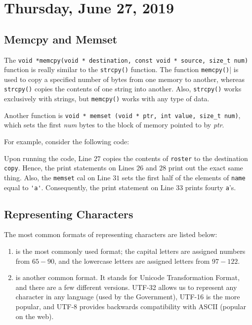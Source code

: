 \section{Thursday, June 27, 2019}
\subsection{Memcpy and Memset}
The \verb!void *memcpy(void * destination, const void * source, size_t num)! function is really similar to the \verb!strcpy()! function. The function \verb!memcpy()!| is used to copy a specified number of bytes from one memory to another, whereas \verb!strcpy()! copies the contents of one string into another. Also, \verb!strcpy()! works exclusively with strings, but \verb!memcpy()! works with any type of data.


Another function is \verb!void * memset (void * ptr, int value, size_t num)!, which sets the first \textit{num} bytes to the block of memory pointed to by \textit{ptr}.

For example, consider the following code:
    
    \lstset{
    caption=Memset and Memcpy}
    \begin{center}
    \label{Memset and Memcpy}
    \end{center}

Upon running the code, Line $27$ copies the contents of \verb!roster! to the destination \verb!copy!. Hence, the print statements on Lines $26$ and $28$ print out the exact same thing. Also, the \verb!memset! cal on Line $31$ sets the first half of the elements of \verb!name! equal to \verb!'a'!. Consequently, the print statement on Line $33$ prints fourty \verb!a!'s.


\subsection{Representing Characters}
The most common formats of representing characters are listed below: \begin{enumerate}
    \item {} is the most commonly used format; the capital letters are assigned numbers from $65-90$, and the lowercase letters are assigned letters from $97-122$. 
    \item {} is another common format. It stands for Unicode Transformation Format, and there are a few different versions. UTF-32 allows us to represent any character in any language (used by the Government), UTF-16 is the more popular, and UTF-8 provides backwards compatibility with ASCII (popular on the web).
\end{enumerate}


